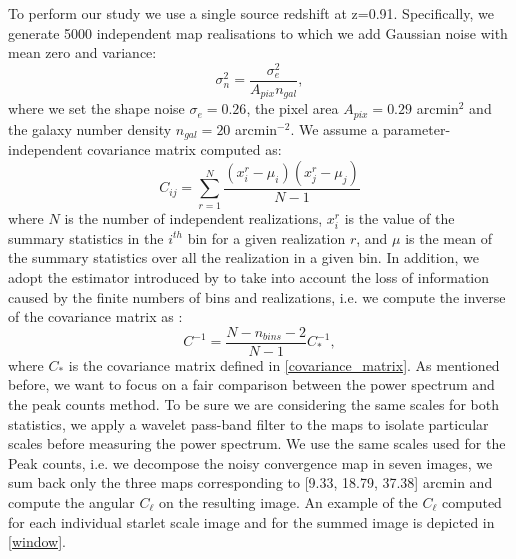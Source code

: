 \documentclass{aa}
\begin{document}
To perform our study we use a single source redshift at z=0.91. Specifically, we generate 5000 independent map realisations to which we add Gaussian noise with mean zero and variance:
 \begin{equation}
     \sigma^2_n= \frac{\sigma_e^2}{A_{pix}n_{gal}},
 \end{equation}
where we set the shape noise $\sigma_e = 0.26$, the pixel area $A_{pix}=0.29$ arcmin$^2$ and the galaxy number density $n_{gal}=20$ arcmin$^{-2}$.  
We assume a parameter-independent covariance matrix computed as:
\begin{equation}\label{covariance_matrix}
    C_{ij}=\sum_{r=1}^N
    \frac{(x_i^r-\mu_i)(x_j^r-\mu_j)}{N-1}
\end{equation}
where $N$ is the number of independent realizations, $x_i^r$ is the value of the summary statistics in the $i^{th}$ bin for a given realization $r$, and $\mu$ is the mean of the summary statistics over all the realization in a given bin. 
In addition, we adopt the estimator introduced by \cite{hartlap2007your} to take into account the loss of information caused by the finite numbers of bins and realizations, i.e. we compute the inverse of the covariance matrix as :
\begin{equation}
    C^{-1}=\frac{N-n_{bins}-2}{N-1}C_{*}^{-1},
\end{equation}
where $C_{*}$ is the covariance matrix defined in \autoref{covariance_matrix}. 
As mentioned before, we want to focus on a fair comparison between the power spectrum and the peak counts method. To be sure we are considering the same scales for both statistics, we apply a wavelet pass-band filter to the maps to isolate particular scales before measuring the power spectrum.  We use the same scales used for the Peak counts, i.e. we decompose the noisy convergence map in seven images, we sum back only the three maps corresponding to [9.33, 18.79, 37.38] arcmin and compute the angular $C_{\ell}$ on the resulting image.
An example of the $C_{\ell}$ computed for each individual starlet scale image and for the summed image is depicted in \autoref{window}.
\end{document}
